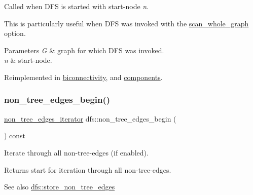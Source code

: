 Called when D\+FS is started with start-\/node {\itshape n}. 

This is particularly useful when D\+FS was invoked with the \mbox{\hyperlink{classdfs_aa7c864a6f3a120720138b187b3ed95b5}{scan\+\_\+whole\+\_\+graph}} option.


\begin{DoxyParams}{Parameters}
{\em G} & graph for which D\+FS was invoked. \\
\hline
{\em n} & start-\/node. \\
\hline
\end{DoxyParams}


Reimplemented in \mbox{\hyperlink{classbiconnectivity_ae94213830755f1f4d477ec6bff0f25b8}{biconnectivity}}, and \mbox{\hyperlink{classcomponents_af53365bd737b34cf63e4a6b10879ffcc}{components}}.

\mbox{\label{classdfs_a4efe5bb72d00305e6b226e67c2b2ef6e}} 
\subsubsection{\texorpdfstring{non\+\_\+tree\+\_\+edges\+\_\+begin()}{non\_tree\_edges\_begin()}}
{\footnotesize\ttfamily \mbox{\hyperlink{classdfs_ae7301f3d4417e60fb3a499180375194e}{non\+\_\+tree\+\_\+edges\+\_\+iterator}} dfs\+::non\+\_\+tree\+\_\+edges\+\_\+begin (\begin{DoxyParamCaption}{ }\end{DoxyParamCaption}) const\hspace{0.3cm}{\ttfamily [inline]}}



Iterate through all non-\/tree-\/edges (if enabled). 

\begin{DoxyReturn}{Returns}
start for iteration through all non-\/tree-\/edges. 
\end{DoxyReturn}
\begin{DoxySeeAlso}{See also}
\mbox{\hyperlink{classdfs_a6f54f1c4339eacc8961e795439d4593d}{dfs\+::store\+\_\+non\+\_\+tree\+\_\+edges}} 
\end{DoxySeeAlso}
\mbox{\label{classdfs_ad9cd92a18bda23edca8ab3ac60a15ef4}} 
